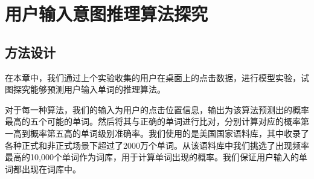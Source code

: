 \chapter{用户输入意图推理算法探究}
\label{cha:algorithm}
\section{方法设计}
在本章中，我们通过上个实验收集的用户在桌面上的点击数据，进行模型实验，试图探究能够预测用户输入单词的推理算法。

对于每一种算法，我们的输入为用户的点击位置信息，输出为该算法预测出的概率最高的五个可能的单词。然后将其与正确的单词进行比对，分别计算对应的概率第一高到概率第五高的单词级别准确率。我们使用的是美国国家语料库，其中收录了各种正式和非正式场景下超过了2000万个单词。从该语料库中我们挑选了出现频率最高的10,000个单词作为词库，用于计算单词出现的概率。我们保证用户输入的单词都出现在词库中。